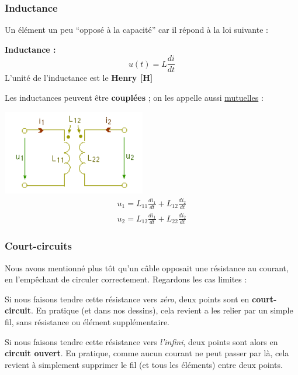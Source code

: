 \documentclass[12pt,a4paper]{article}
\begin{document}
\subsubsection{Inductance}
\label{subsubsection: inductance}
Un élément un peu ``opposé à la capacité'' car il répond à la loi suivante :
\begin{boite}
	\textbf{Inductance :}
	\begin{equation}
		u(t) = L\frac{d{i}}{d{t}}
	\end{equation}
	L'unité de l'inductance est le \textbf{Henry [H]}
\end{boite}
Les inductances peuvent être \textbf{couplées} ; on les appelle aussi \uline{mutuelles} :
\begin{multicols}{2}
\includegraphics[scale=0.8]{images/inductance_couplee.png}~\columnbreak
~\\
\begin{align}
    u_1 = L_{11}\frac{di_1}{dt} + L_{12}\frac{di_2}{dt}\\
    u_2 = L_{12}\frac{di_1}{dt} + L_{22}\frac{di_2}{dt}
\end{align}

\end{multicols}%

\subsubsection{Court-circuits}
Nous avons mentionné plus tôt qu'un câble opposait une résistance au courant, en l'empêchant de circuler correctement. Regardons les cas limites :

Si nous faisons tendre cette résistance vers \textit{zéro}, deux points sont en \textbf{court-circuit}. En pratique (et dans nos dessins), cela revient a les relier par un simple fil, sans résistance ou élément supplémentaire.

Si nous faisons tendre cette résistance vers \textit{l'infini}, deux points sont alors en \textbf{circuit ouvert}. En pratique, comme aucun courant ne peut passer par là, cela revient à simplement supprimer le fil (et tous les éléments) entre deux points.
\end{document}
